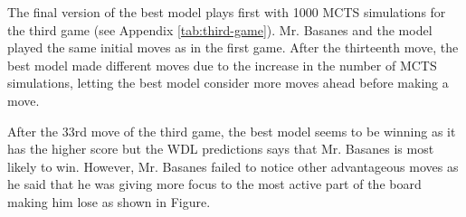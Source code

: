 
The final version of the best model plays first with 1000 MCTS simulations for the third game (see Appendix \ref{tab:third-game}). Mr. Basanes and the model played the same initial moves as in the first game. After the thirteenth move, the best model made different moves due to the increase in the number of MCTS simulations, letting the best model consider more moves ahead before making a move.

After the 33rd move of the third game, the best model seems to be winning as it has the higher score but the WDL predictions says that Mr. Basanes is most likely to win. However, Mr. Basanes failed to notice other advantageous moves as he said that he was giving more focus to the most active part of the board making him lose as shown in Figure. 





